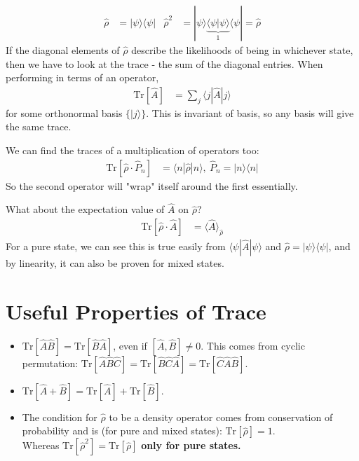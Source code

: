 \documentclass[a4paper, 11pt, normalem]{report}
\newcommand\hrho{\hat{\rho}}
\begin{document}
\begin{align}
    \hrho &= |\psi\rangle\langle\psi| & \hrho^2 &= |\psi\rangle\underbrace{\langle\psi|\psi\rangle}_{1}\langle\psi| = \hrho
\end{align}
If the diagonal elements of $\hrho$ describe the likelihoods of being in whichever state, then we have to look at the trace - the sum of the diagonal entries. 
When performing in terms of an operator, 
\begin{align}
    \text{Tr}[\hat{A}] &= \sum_j \langle j|\hat{A}|j\rangle
\end{align}
for some orthonormal basis $\{|j\rangle\}$.
This is invariant of basis, so any basis will give the same trace.

We can find the traces of a multiplication of operators too:
\begin{align}
    \text{Tr}[\hrho\cdot\hat{P}_n] &= \langle n|\hrho|n\rangle,~ \hat{P}_n = |n\rangle\langle n|
\end{align}
So the second operator will "wrap" itself around the first essentially. 

What about the expectation value of $\hat{A}$ on $\hrho$?
\begin{align}
    \text{Tr}[\hrho\cdot\hat{A}] &= \langle\hat{A}\rangle_{\hrho}
\end{align}
For a pure state, we can see this is true easily from $\langle\psi|\hat{A}|\psi\rangle$ and $\hrho = |\psi\rangle\langle\psi|$, and by linearity, it can also be proven for mixed states. 

\section{Useful Properties of Trace}
\begin{itemize}
    \item $\text{Tr}[\hat{A}\hat{B}] = \text{Tr}[\hat{B}\hat{A}]$, even if $[\hat{A},\hat{B}]\neq0$.
        This comes from cyclic permutation: $\text{Tr}[\hat{A}\hat{B}\hat{C}] = \text{Tr}[\hat{B}\hat{C}\hat{A}] = \text{Tr}[\hat{C}\hat{A}\hat{B}]$.
    \item $\text{Tr}[\hat{A}+\hat{B}] = \text{Tr}[\hat{A}] + \text{Tr}[\hat{B}]$.
    \item The condition for $\hrho$ to be a density operator comes from conservation of probability and is (for pure and mixed states): $\text{Tr}[\hrho] = 1$. \\
        Whereas $\text{Tr}[\hrho^2]=\text{Tr}[\hrho]$ \textbf{only for pure states.}
\end{itemize}
\end{document}
